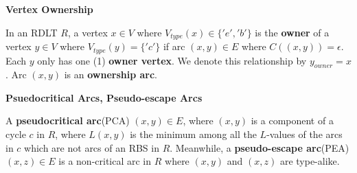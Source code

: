 \documentclass[12pt]{article}
\begin{document}
        \begin{definition} \textbf{Vertex Ownership} \cite{yiu}
            
            In an RDLT \begin{math}R\end{math}, a vertex \begin{math}x \in V\end{math} where \begin{math}V_{type}(x) \in \{'e','b'\}\end{math} is the \textbf{owner} of a vertex \begin{math}y \in V\end{math} where \begin{math}V_{type}(y) = \{'c'\}\end{math} if arc \begin{math} (x,y) \in E \end{math} where \begin{math} C((x,y)) = \epsilon \end{math}. Each \begin{math} y \end{math} only has one (1) \textbf{owner vertex}. We denote this relationship by \begin{math} y_{owner} = x \end{math}. Arc \begin{math} (x,y) \end{math} is an \textbf{ownership arc}.
        
        \end{definition}

        \begin{definition} \textbf{Psuedocritical Arcs, Pseudo-escape Arcs} \cite{malinao-wctp}
            
            A \textbf{pseudocritical arc}(PCA) $(x,y)\in E$, where $(x,y)$ is a component of a cycle $c$ in $R$, where $L(x,y)$ is the minimum among all the $L$-values of the arcs in $c$ which are not arcs of an RBS in $R$.
            Meanwhile, a \textbf{pseudo-escape arc}(PEA) $(x,z) \in E$ is a non-critical arc in $R$ where $(x,y)$ and $(x,z)$ are type-alike.
        
        \end{definition}
\end{document}
